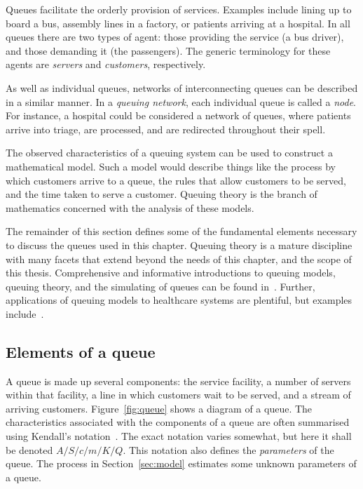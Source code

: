 Queues facilitate the orderly provision of services. Examples include lining up
to board a bus, assembly lines in a factory, or patients arriving at a hospital.
In all queues there are two types of agent: those providing the
service (a bus driver), and those demanding it (the passengers). The generic
terminology for these agents are \emph{servers} and \emph{customers},
respectively.

As well as individual queues, networks of interconnecting queues can be
described in a similar manner. In a \emph{queuing network}, each individual
queue is called a \emph{node}. For instance, a hospital could be considered a
network of queues, where patients arrive into triage, are processed, and are
redirected throughout their spell.

The observed characteristics of a queuing system can be used to construct a
mathematical model. Such a model would describe things like the process by which
customers arrive to a queue, the rules that allow customers to be served, and
the time taken to serve a customer. Queuing theory is the branch of mathematics
concerned with the analysis of these models.

The remainder of this section defines some of the fundamental elements necessary
to discuss the queues used in this chapter. 
Queuing theory is a mature discipline with many facets that extend
beyond the needs of this chapter, and the scope of this thesis. Comprehensive
and informative introductions to queuing models, queuing theory, and the
simulating of queues can be found in~\cite{Bhat2015,Shortle2018,Stewart2009}.
Further, applications of queuing models to healthcare systems are plentiful, but
examples include~\cite{%
    Bittencourt2018,Cochran2009,Mohammadi2012,Steins2013,Williams2015,Yom2014%
}.

\subsection{Elements of a queue}\label{subsec:elements}

A queue is made up several components: the service facility, a number of servers
within that facility, a line in which customers wait to be served, and a stream
of arriving customers. Figure~\ref{fig:queue} shows a diagram of a queue. The
characteristics associated with the components of a queue are often summarised
using Kendall's notation~\cite{Stewart2009}. The exact notation varies somewhat,
but here it shall be denoted \(A/S/c/m/K/Q\). This notation also defines the
\emph{parameters} of the queue. The process in Section~\ref{sec:model} estimates
some unknown parameters of a queue.


